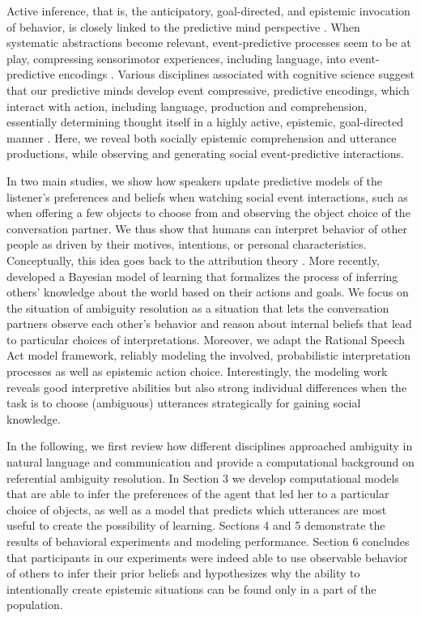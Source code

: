 \documentclass[10pt,a4paper]{article}
\begin{document}
Active inference, that is, the anticipatory, goal-directed, and epistemic invocation of behavior, is
closely linked to the predictive mind perspective \cite{Friston:2015,Hohwy:2013,Clark:2016}. 
When systematic abstractions become relevant, event-predictive processes seem to be at play, compressing sensorimotor experiences, including language, into event-predictive encodings \cite{Butz:2016,Butz:2017a}.
Various disciplines associated with cognitive science suggest that our predictive minds develop event compressive, predictive encodings, which interact with action, including language, production and comprehension, essentially determining thought itself in a highly active, epistemic, goal-directed manner  \cite{Baldwin:2019tsi,DuBrow:2019tsi,Elsner:2019tsi,Fallgatter:2019tsi,Knott:2019tsi,Papafragou:2019tsi,Zacks:2019tsi}.
Here, we reveal both socially epistemic comprehension and utterance productions, while observing and generating social event-predictive interactions.

In two main studies, we show how speakers update predictive models of the listener's preferences and beliefs when watching social event interactions, such as when offering a few objects to choose from and observing the object choice of the conversation partner. 
We thus show that humans can interpret behavior of other people as driven by their motives, intentions, or personal characteristics.
Conceptually, this idea goes back to the attribution theory \cite{jones1965acts, kelley1967attribution, kelley1970social}.
More recently,  developed a Bayesian model of learning that formalizes the process of inferring others' knowledge about the world based on their actions and goals. 
We focus on the situation of ambiguity resolution as a situation that lets the conversation partners observe each other's behavior and reason about internal beliefs that lead to particular choices of interpretations.
Moreover, we adapt the Rational Speech Act model framework, reliably modeling the involved, probabilistic interpretation processes as well as epistemic action choice. 
Interestingly, the modeling work reveals good interpretive abilities but also strong individual differences when the task is to choose (ambiguous) utterances strategically for gaining social knowledge. 


In the following, we first review how different disciplines approached ambiguity in natural language and communication and provide a computational background on referential ambiguity resolution. 
In Section 3 we develop computational models that are able to infer the preferences of the agent that led her to a particular choice of objects, as well as a model that predicts which utterances are most useful to create the possibility of learning. 
Sections 4 and 5 demonstrate the results of behavioral experiments and modeling performance. 
Section 6 concludes that participants in our experiments were indeed able to use observable behavior of others to infer their prior beliefs and hypothesizes why the ability to intentionally create epistemic situations can be found only in a part of the population.
\end{document}
